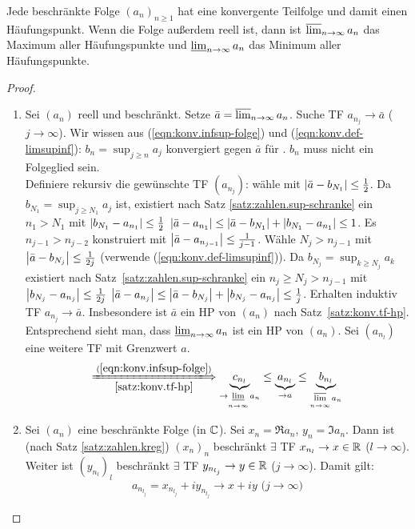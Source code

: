 \documentclass[12pt]{scrreprt}
\begin{document}
\begin{thm}
  \label{thm:konv.bw}
  Jede beschränkte Folge $(a_n)_{n\ge1}$ hat eine konvergente
  Teilfolge und damit einen Häufungspunkt. Wenn die Folge außerdem
  reell ist, dann ist $\varlimsup_{n\rightarrow\infty}{a_n}$ das Maximum aller
  Häufungspunkte und $\varliminf_{n\rightarrow\infty}{a_n}$ das Minimum aller
  Häufungspunkte.
\end{thm}
\begin{proof}
  \begin{enumerate}
  \item Sei $(a_n)$ reell und beschränkt. Setze $\bar{a} = \varlimsup_{n\rightarrow\infty}{a_n}$. Suche TF $a_{n_j}\to\bar{a}$ ($j\to\infty$). Wir wissen aus (\ref{eqn:konv.infsup-folge}) und (\ref{eqn:konv.def-limsupinf}): $b_n=\sup_{j\ge n}{a_j}$ konvergiert gegen $\bar{a}$ für \ninf. $b_n$ muss nicht ein Folgeglied sein.\\
    Definiere rekursiv die gewünschte TF $(a_{n_j})$: wähle 
    mit $\left\lvert\bar{a}-b_{N_1}\right\lvert\le\frac12$. Da $b_{N_1} = \sup_{j\ge
      N_1}{a_j}$ ist, existiert nach Satz
    \ref{satz:zahlen.sup-schranke} ein $n_1>N_1$ mit
    $\left\lvert b_{N_1}-a_{n_1}\right\lvert\le\frac12$ \folgt $\left\lvert\bar{a}-a_{n_1}\right\lvert
    \le \left\lvert\bar{a}-b_{N_1}\right\lvert + \left\lvert b_{N_1}-a_{n_1}\right\lvert \le 1$. Es
    $n_{j-1}>n_{j-2}$ konstruiert mit
    $\left\lvert\bar{a}-a_{n_{j-1}}\right\lvert\le\frac{1}{j-1}$. Wähle $N_j>n_{j-1}$
    mit $\left\lvert\bar{a}-b_{N_j}\right\lvert\le\frac{1}{2j}$ (verwende
    (\ref{eqn:konv.def-limsupinf})). Da $b_{N_j} = \sup_{k\ge
      N_j}{a_k}$ existiert nach Satz~\ref{satz:zahlen.sup-schranke}
    ein $n_j\ge N_j>n_{j-1}$ mit
    $\left\lvert b_{N_j}-a_{n_j}\right\lvert\le\frac{1}{2j}$ \folgt
    $\left\lvert\bar{a}-a_{n_j}\right\lvert \le \left\lvert\bar{a}-b_{N_j}\right\lvert +
    \left\lvert b_{N_j}-a_{n_j}\right\lvert \le \frac1j$. Erhalten induktiv TF
    $a_{n_j}\to\bar{a}$. Insbesondere ist $\bar{a}$ ein HP von $(a_n)$
    nach Satz~\ref{satz:konv.tf-hp}. Entsprechend sieht man, dass
    $\varliminf_{n\rightarrow\infty}{a_n}$ ist ein HP von $(a_n)$. Sei $(a_{n_l})$ eine
    weitere TF mit Grenzwert $a$.
    \[\xLongrightarrow[\ref{satz:konv.tf-hp}]{(\ref{eqn:konv.infsup-folge})}
    \underbrace{c_{n_l}}_{\to\li\limits_{\ninf}{a_n}} \le
    \underbrace{a_{n_l}}_{\to a} \le
    \underbrace{b_{n_l}}_{\ls\limits_{\ninf}{a_n}}\]
  \item Sei $(a_n)$ eine beschränkte Folge (in $\mathbb{C}$). Sei
    $x_n=\Re{a_n}$, $y_n=\Im{a_n}$. Dann ist (nach Satz
    \ref{satz:zahlen.kreg}) $(x_n)_n$ beschränkt 
    $\exists$ TF $x_{n_l}\to x\in\mathbb{R}$ ($l\to\infty$). Weiter ist
    $(y_{n_l})_l$ beschränkt  $\exists$ TF
    $y_{n_{l_j}}\to y\in\mathbb{R}$ ($j\to\infty$). Damit gilt:
    \[a_{n_{l_j}} = x_{n_{l_j}} + iy_{n_{l_j}} \to x+iy \text{ (}
    j\to\infty \text{)}\]
  \end{enumerate}
\end{proof}
\end{document}
